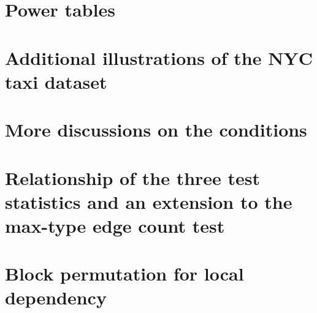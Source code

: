 \documentclass[arxiv, preprint]{imsart}
\numberwithin{equation}{section}
\theoremstyle{plain}
\begin{document}
\section{Power tables} 
\label{sec:power}

\section{Additional illustrations of the NYC taxi dataset} 
\label{sec:NYfigures} 

\section{More discussions on the conditions}
\label{sec:condition}

%

\section{Relationship of the three test statistics and an extension to the max-type edge count test}
\label{sec:Mk}

\section{Block permutation for local dependency}
\label{sec:bp}



\end{document}
